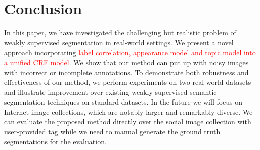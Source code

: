 \section{Conclusion}
In this paper, we have investigated the challenging but realistic problem of weakly supervised segmentation in real-world settings. We present a novel approach incorporating {\textcolor{red}{ label correlation, appearance model and topic model into a unified CRF model}}. We show that our method can put up with noisy images with incorrect or incomplete annotations. To demonstrate both robustness and effectiveness of our method, we perform experiments on two real-world datasets and illustrate improvement over existing weakly supervised semantic segmentation techniques on standard datasets.
In the future we will focus on Internet image collections, which are notably larger and remarkably diverse. We can evaluate the proposed method directly over the social image collection with user-provided tag while we need to manual generate the ground truth segmentations for the evaluation.

